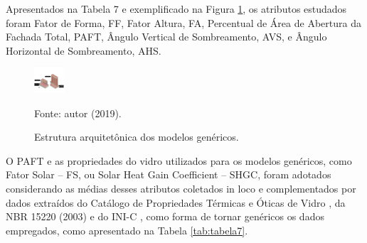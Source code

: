 \noindent Apresentados na Tabela 7 e exemplificado na Figura \ref{fig:figura11}, os atributos estudados foram Fator de 
Forma, FF, Fator Altura, FA, Percentual de Área de Abertura da Fachada Total, PAFT, Ângulo 
Vertical de Sombreamento, AVS, e Ângulo Horizontal de Sombreamento, AHS.
    \begin{figure}[ht]
        \centering
        \caption{\small Estrutura arquitetônica dos modelos genéricos.}
        \includegraphics[width=0.1\textwidth]{figures/fig11_8-19-2pav.png}
        \begin{flushleft}
            \par \small Fonte: autor (2019).
        \end{flushleft}
        \label{fig:figura11}
    \end{figure}\newline
\noindent O PAFT e as propriedades do vidro utilizados para os modelos genéricos, como Fator Solar – FS, 
ou Solar Heat Gain Coefficient – SHGC, foram adotados considerando as médias desses atributos 
coletados in loco e complementados por dados extraídos do Catálogo de Propriedades Térmicas e 
Óticas de Vidro \cite{CentroBrasileirodeEficienciaEnergeticaemEdificacoesCB3E2015,AssociacaoBrasileiradeNormasTecnicas-ABNT2003}, da NBR 15220 (2003) e do INI-C \cite{InstitutoNacionaldeMetrologiaNormalizacaoeQualidadeIndustrial-INMETRO2018}, 
como forma de tornar genéricos os dados empregados, como apresentado na Tabela \ref{tab:tabela7}.\vspace*{0.3cm} \newline
